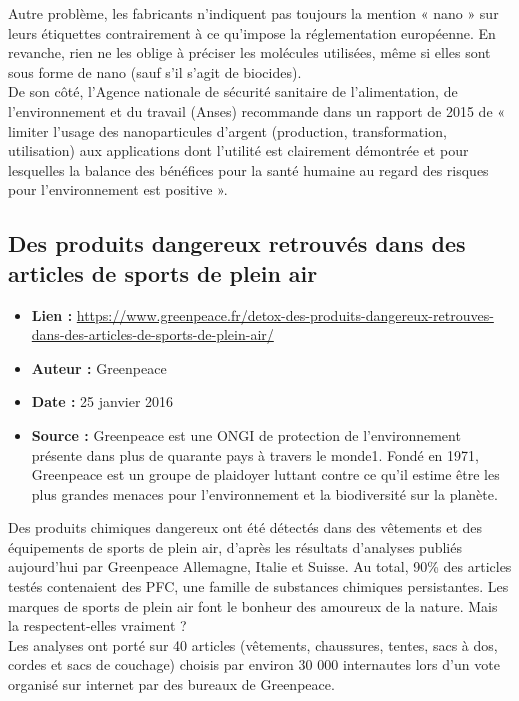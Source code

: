 \documentclass[8pt]{article}
\begin{document}
Autre problème, les fabricants n’indiquent pas toujours la mention « nano » sur leurs étiquettes contrairement à ce qu’impose la réglementation européenne. En revanche, rien ne les oblige à préciser les molécules utilisées, même si elles sont sous forme de nano (sauf s’il s’agit de biocides).\\

De son côté, l’Agence nationale de sécurité sanitaire de l’alimentation, de l’environnement et du travail (Anses) recommande dans un rapport de 2015 de « limiter l’usage des nanoparticules d’argent (production, transformation, utilisation) aux applications dont l’utilité est clairement démontrée et pour lesquelles la balance des bénéfices pour la santé humaine au regard des risques pour l’environnement est positive ». 

\newpage
\subsection{Des produits dangereux retrouvés dans des articles de sports de plein air}
\begin{itemize}
	\item \textbf{Lien : }  \url{https://www.greenpeace.fr/detox-des-produits-dangereux-retrouves-dans-des-articles-de-sports-de-plein-air/} 
	\item \textbf{Auteur : } Greenpeace
	\item \textbf{Date : }  25 janvier 2016
	\item \textbf{Source : } Greenpeace est une ONGI de protection de l'environnement présente dans plus de quarante pays à travers le monde1. Fondé en 1971, Greenpeace est un groupe de plaidoyer luttant contre ce qu'il estime être les plus grandes menaces pour l'environnement et la biodiversité sur la planète.	
\end{itemize}



Des produits chimiques dangereux ont été détectés dans des vêtements et des équipements de sports de plein air, d’après les résultats d’analyses publiés aujourd’hui par Greenpeace Allemagne, Italie et Suisse. Au total, 90\% des articles testés contenaient des PFC, une famille de substances chimiques persistantes. Les marques de sports de plein air font le bonheur des amoureux de la nature. Mais la respectent-elles vraiment ?\\

Les analyses ont porté sur 40 articles (vêtements, chaussures, tentes, sacs à dos, cordes et sacs de couchage) choisis par environ 30 000 internautes lors d’un vote organisé sur internet par des bureaux de Greenpeace.\\
\end{document}
